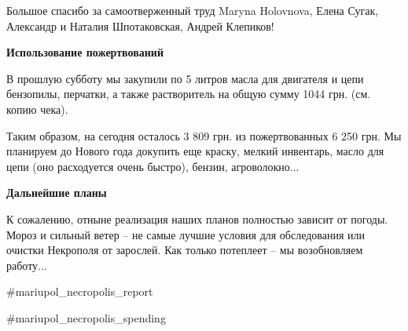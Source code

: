 Большое спасибо за самоотверженный труд Maryna Holovnova, Елена Сугак,
Александр и Наталия Шпотаковская, Андрей Клепиков!

\textbf{Использование пожертвований}

В прошлую субботу мы закупили по 5 литров масла для двигателя и цепи бензопилы,
перчатки, а также растворитель на общую сумму 1044 грн. (см. копию чека).

Таким образом, на сегодня осталось 3 809 грн. из пожертвованных 6 250 грн. Мы
планируем до Нового года докупить еще краску, мелкий инвентарь, масло для цепи
(оно расходуется очень быстро), бензин, агроволокно...

\textbf{Дальнейшие планы}

К сожалению, отныне реализация наших планов полностью зависит от погоды. Мороз
и сильный ветер – не самые лучшие условия для обследования или очистки
Некрополя от зарослей. Как только потеплеет – мы возобновляем работу...

\#mariupol\_necropolis\_report

\#mariupol\_necropolis\_spending
